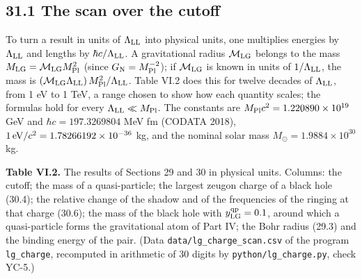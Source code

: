 \documentclass[
  10pt,
]{article}
\begin{document}
\hypertarget{the-scan-over-the-cutoff}{%
\subsection{31.1 The scan over the
cutoff}\label{the-scan-over-the-cutoff}}

To turn a result in units of \(\Lambda_{\rm LL}\) into physical units,
one multiplies energies by \(\Lambda_{\rm LL}\) and lengths by
\(\hbar c/\Lambda_{\rm LL}\). A gravitational radius
\(\mathcal M_{\rm LG}\) belongs to the mass
\(M_{\rm LG}=\mathcal M_{\rm LG}M_{\rm Pl}^2\) (since
\(G_{\rm N}=M_{\rm Pl}^{-2}\)); if \(\mathcal M_{\rm LG}\) is known in
units of \(1/\Lambda_{\rm LL}\), the mass is
\((\mathcal M_{\rm LG}\Lambda_{\rm LL})\,M_{\rm Pl}^2/\Lambda_{\rm LL}\).
Table VI.2 does this for twelve decades of \(\Lambda_{\rm LL}\), from 1
eV to 1 TeV, a range chosen to show how each quantity scales; the
formulas hold for every \(\Lambda_{\rm LL}\ll M_{\rm Pl}\). The
constants are \(M_{\rm Pl}c^2=1.220890\times10^{19}\) GeV and
\(\hbar c=197.3269804\) MeV fm (CODATA 2018),
\(1\,{\rm eV}/c^2=1.78266192\times10^{-36}\) kg, and the nominal solar
mass \(M_\odot=1.9884\times10^{30}\) kg.

\textbf{Table VI.2.} The results of Sections 29 and 30 in physical
units. Columns: the cutoff; the mass of a quasi-particle; the largest
zeugon charge of a black hole (30.4); the relative change of the shadow
and of the frequencies of the ringing at that charge (30.6); the mass of
the black hole with \(y^{\rm qp}_{\rm LG}=0.1\), around which a
quasi-particle forms the gravitational atom of Part IV; the Bohr radius
(29.3) and the binding energy of the pair. (Data
\texttt{data/lg\_charge\_scan.csv} of the program \texttt{lg\_charge},
recomputed in arithmetic of 30 digits by \texttt{python/lg\_charge.py},
check YC-5.)
\end{document}
